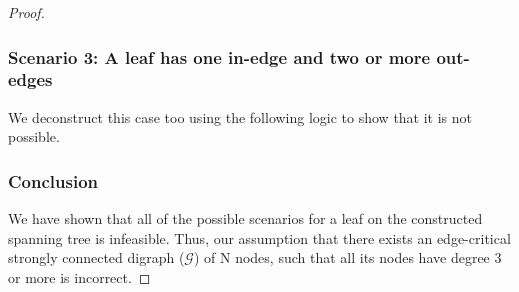 \documentclass[runningheads]{llncs}
\begin{document}
\begin{proof}
\subsubsection{Scenario 3: A leaf has one in-edge and two or more out-edges} We deconstruct this case too using the following logic to show that it is not possible.

\subsubsection{Conclusion} We have shown that all of the possible scenarios for a leaf on the constructed spanning tree is infeasible. Thus, our assumption that there exists an edge-critical strongly connected digraph ($\mathcal{G}$) of N nodes, such that all its nodes have degree 3 or more is incorrect.
\end{proof}
\end{document}
